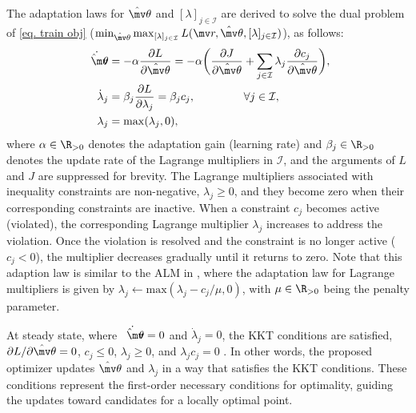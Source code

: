 \documentclass[lettersize,journal]{IEEEtran}
\newcommand*{\fe}{\mv r}
\newcommand*{\wth}{\mv\theta}
\begin{document}
The adaptation laws for $\hat\wth$ and $[\lambda]_{j\in\mathcal I}$ are derived to solve the dual problem of \eqref{eq. train obj} (\ie  $\min_{\hat\wth} \max_{[\lambda]_{j\in\mathcal I}}L(\fe,\hat\wth,[\lambda]_{j\in\mathcal I})$), as follows:
\begin{subequations}
    \begin{align}
            \dot {\hat\wth}&=-\alpha {\partial L\over\partial \hat\wth}
            =-\alpha 
            \bigg(
            {\partial J\over \partial \hat\wth}+\sum_{j\in\mathcal{I}}
            \lambda_j {\partial c_j\over\partial \hat\wth}
            \bigg),
        \label{eq. adaptation law th}
            \\
            \dot\lambda_j& = \beta_j{\partial L\over\partial \lambda_j} = \beta_j c_j ,
            \quad\quad\quad\quad      \      
            \forall j\in\mathcal I,
        \label{eq. adaptation law L}
            \\
            \lambda_j & = \max(\lambda_j,0) ,
        \label{eq. adaptation law L max}
    \end{align}
    \label{eq. adaptation law}
\end{subequations}
where $\alpha\in\R_{>0}$ denotes the adaptation gain (learning rate) and $\beta_j\in\R_{>0}$ denotes the update rate of the Lagrange multipliers in $\mathcal I$, and the arguments of $L$ and $J$ are suppressed for brevity. 
The Lagrange multipliers associated with inequality constraints are non-negative, \ie $\lambda_j\ge 0$, and they become zero when their corresponding constraints are inactive. When a constraint $c_j$ becomes active (\ie violated), the corresponding Lagrange multiplier $\lambda_j$ increases to address the violation. Once the violation is resolved and the constraint is no longer active (\ie $c_j < 0$), the multiplier decreases gradually until it returns to zero. Note that this adaption law is similar to the ALM in \cite{RN22}, where the adaptation law for Lagrange multipliers is given by $\lambda_j\leftarrow \text{max}(\lambda_j-c_j/\mu,0)$, with $\mu\in\R_{>0}$ being the penalty parameter. 

At steady state, where $\dot{\hat\wth}=0$ and $\dot\lambda_j=0$, the KKT conditions are satisfied, \ie $\partial L/\partial \hat\wth=0$, $c_j \le 0$, $\lambda_j \ge 0$, and $\lambda_j c_j=0$ \cite[Chap.~12 T.~12.1]{RN22}.
In other words, the proposed optimizer updates $\hat\wth$ and $\lambda_j$ in a way that satisfies the KKT conditions. 
These conditions represent the first-order necessary conditions for optimality, guiding the updates toward candidates for a locally optimal point.
\end{document}
